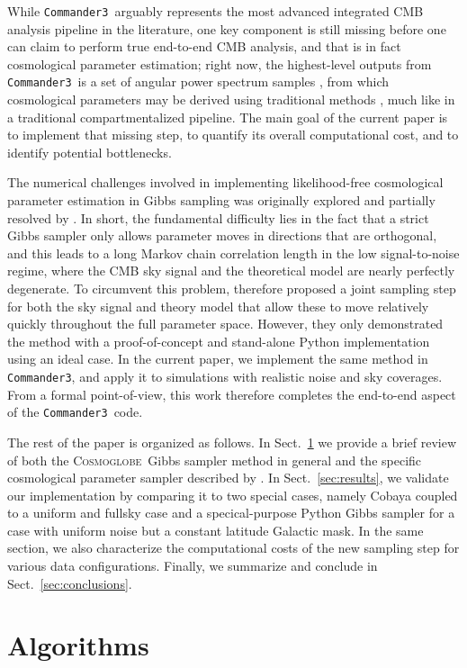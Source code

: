 \documentclass[twocolumn]{../common/aa}
\def\commanderthree{\texttt{Commander3}}
\newcommand{\cosmoglobe}{\textsc{Cosmoglobe}}
\begin{document}
While \commanderthree\ arguably represents the most advanced integrated CMB analysis pipeline in the literature, one key component is still missing before one can claim to perform true end-to-end CMB analysis, and that is in fact cosmological parameter estimation; right now, the highest-level outputs from \commanderthree\ is a set of angular power spectrum samples \citep{bp11}, from which cosmological parameters may be derived using traditional methods \citep{bp12}, much like in a traditional compartmentalized pipeline. The main goal of the current paper is to implement that missing step, to quantify its overall computational cost, and to identify potential bottlenecks.

The numerical challenges involved in implementing likelihood-free cosmological parameter estimation in Gibbs sampling was originally explored and partially resolved by \citet{jewell:2009}. In short, the fundamental difficulty lies in the fact that a strict Gibbs sampler only allows parameter moves in directions that are orthogonal, and this leads to a long Markov chain correlation length in the low signal-to-noise regime, where the CMB sky signal and the theoretical model are nearly perfectly degenerate. To circumvent this problem, \citet{racine:2016} therefore proposed a joint sampling step for both the sky signal and theory model that allow these to move relatively quickly throughout the full parameter space. However, they only demonstrated the method with a proof-of-concept and stand-alone Python implementation using an ideal case. In the current paper, we implement the same method in \commanderthree, and apply it to simulations with realistic noise and sky coverages. From a formal point-of-view, this work therefore completes the end-to-end aspect of the \commanderthree\ code. 

The rest of the paper is organized as follows. In Sect.~\ref{sec:methods} we provide a brief review of both the \cosmoglobe\ Gibbs sampler method in general and the specific cosmological parameter sampler described by \citet{racine:2016}. In Sect.~\ref{sec:results}, we validate our implementation by comparing it to two special cases, namely Cobaya coupled to a uniform and fullsky case and a specical-purpose Python Gibbs sampler for a case with uniform noise but a constant latitude Galactic mask. In the same section, we also characterize the computational costs of the new sampling step for various data configurations. Finally, we summarize and conclude in Sect.~\ref{sec:conclusions}.

\section{Algorithms}
\label{sec:methods}
\end{document}
